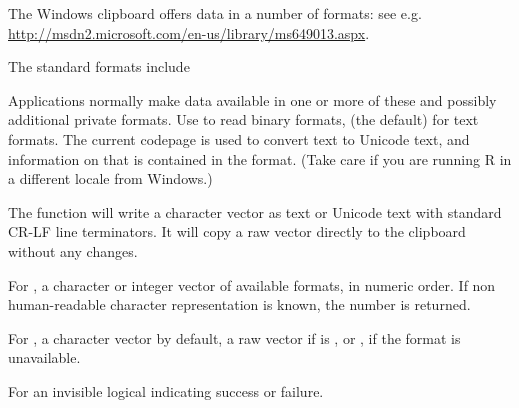 \begin{Details}\relax
The Windows clipboard offers data in a number of formats: see e.g.
\url{http://msdn2.microsoft.com/en-us/library/ms649013.aspx}.

The standard formats include

Applications normally make data available in one or more of these and
possibly additional private formats.  Use  to read binary
formats,  (the default) for text formats.  The
current codepage is used to convert text to Unicode text, and
information on that is contained in the  format.
(Take care if you are running R in a different locale from Windows.)

The  function will write a character vector as
text or Unicode text with standard CR-LF line terminators.  It will
copy a raw vector directly to the clipboard without any changes.
\end{Details}
%
\begin{Value}
For , a character or integer vector of
available formats, in numeric order.  If non human-readable character
representation is known, the number is returned.

For , a character vector by default, a raw vector
if  is , or , if the format is
unavailable.

For  an invisible logical indicating success or
failure.
\end{Value}
